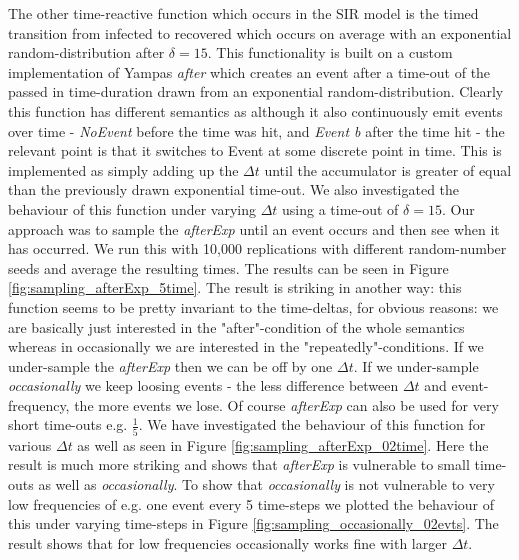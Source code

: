 The other time-reactive function which occurs in the SIR model is the timed transition from infected to recovered which occurs on average with an exponential random-distribution after $\delta = 15$. This functionality is built on a custom implementation of Yampas \textit{after} which creates an event after a time-out of the passed in time-duration drawn from an exponential random-distribution. Clearly this function has different semantics as although it also continuously emit events over time - \textit{NoEvent} before the time was hit, and \textit{Event b} after the time hit - the relevant point is that it switches to Event at some discrete point in time. This is implemented as simply adding up the $\Delta t$ until the accumulator is greater of equal than the previously drawn exponential time-out. We also investigated the behaviour of this function under varying $\Delta t$ using a time-out of $\delta = 15$. Our approach was to sample the \textit{afterExp} until an event occurs and then see when it has occurred. We run this with 10,000 replications with different random-number seeds and average the resulting times. The results can be seen in Figure \ref{fig:sampling_afterExp_5time}. The result is striking in another way: this function seems to be pretty invariant to the time-deltas, for obvious reasons: we are basically just interested in the "after"-condition of the whole semantics whereas in occasionally we are interested in the "repeatedly"-conditions. If we under-sample the \textit{afterExp} then we can be off by one $\Delta t$. If we under-sample \textit{occasionally} we keep loosing events - the less difference between $\Delta t$ and event-frequency, the more events we lose. Of course \textit{afterExp} can also be used for very short time-outs e.g. $\frac{1}{5}$. We have investigated the behaviour of this function for various $\Delta t$ as well as seen in Figure \ref{fig:sampling_afterExp_02time}. Here the result is much more striking and shows that \textit{afterExp} is vulnerable to small time-outs as well as \textit{occasionally}.  
To show that \textit{occasionally} is not vulnerable to very low frequencies of e.g. one event every 5 time-steps we plotted the behaviour of this under varying time-steps in Figure \ref{fig:sampling_occasionally_02evts}. The result shows that for low frequencies occasionally works fine with larger $\Delta t$.

